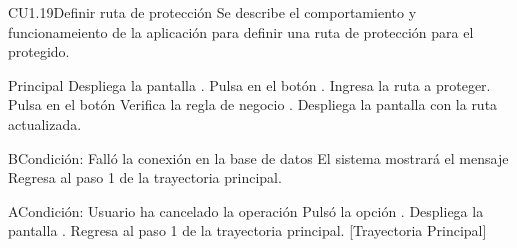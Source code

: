 \begin{UseCase}{CU1.19}{Definir ruta de protección}{
	Se describe el comportamiento y funcionameiento de la aplicación para definir una ruta de protección para el protegido.}
	\end{UseCase}


	\begin{UCtrayectoria}{Principal}
		\UCpaso[\UCsist] Despliega la pantalla . 
		\UCpaso[\UCactor] Pulsa en el botón .
		\UCpaso[\UCactor] Ingresa la ruta a proteger.
		\UCpaso[\UCactor] Pulsa en el botón  
		\UCpaso[\UCsist] Verifica la regla de negocio . 
		\UCpaso[\UCsist] Despliega la pantalla  con la ruta actualizada. 
	\end{UCtrayectoria}


	\begin{UCtrayectoriaA}{B}{Condición: Falló la conexión en la base de datos}
		\UCpaso[\UCsist] El sistema mostrará el mensaje 
		\UCpaso[\UCsist] Regresa al paso 1 de la trayectoria principal. 
	\end{UCtrayectoriaA}
	\begin{UCtrayectoriaA}{A}{Condición: Usuario ha cancelado la operación}
		\UCpaso[\UCactor] Pulsó la opción .
		\UCpaso[\UCsist] Despliega la pantalla .
		\UCpaso[\UCsist] Regresa al paso 1 de la trayectoria principal. [Trayectoria Principal]
	\end{UCtrayectoriaA}

